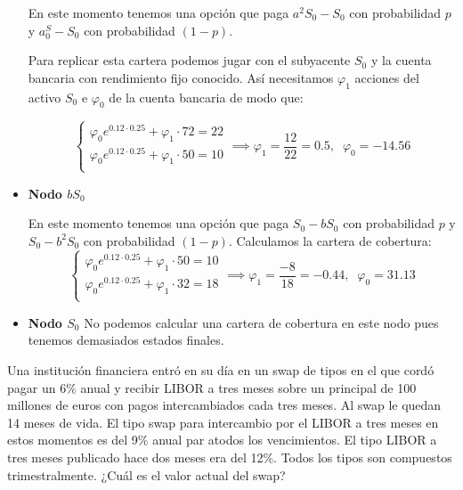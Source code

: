 \begin{problem}[2]
\begin{itemize}
En este momento tenemos una opción que paga $a^2S_0-S_0$ con probabilidad $p$ y $a^S_0-S_0$ con probabilidad $(1-p)$.

Para replicar esta cartera podemos jugar con el subyacente $S_0$ y la cuenta bancaria con rendimiento fijo conocido. Así necesitamos $\varphi_1$ acciones del activo $S_0$ e $\varphi_0$ de la cuenta bancaria de modo que:

\[\left\{\begin{array}{l}
\varphi_0 e^{0.12\cdot 0.25}+\varphi_1 \cdot 72 = 22 \\
\varphi_0 e^{0.12\cdot 0.25}+\varphi_1 \cdot 50 = 10 \\
\end{array}\right. \implies \varphi_1 = \frac{12}{22} = 0.5, \;\; \varphi_0 = -14.56\]

\item \textbf{Nodo $bS_0$}

En este momento tenemos una opción que paga $S_0-bS_0$ con probabilidad $p$ y $S_0-b^2S_0$ con probabilidad $(1-p)$. Calculamos la cartera de cobertura:
\[\left\{\begin{array}{l}
\varphi_0 e^{0.12\cdot 0.25}+\varphi_1 \cdot 50 = 10 \\
\varphi_0 e^{0.12\cdot 0.25}+\varphi_1 \cdot 32 = 18 \\
\end{array}\right. \implies \varphi_1 = \frac{-8}{18} = -0.44, \;\; \varphi_0 = 31.13\]

\item \textbf{Nodo $S_0$}
No podemos calcular una cartera de cobertura en este nodo pues tenemos demasiados estados finales.
\end{itemize}

\end{problem}

\begin{problem}[3]
Una institución financiera entró en su día en un swap de tipos en el que cordó pagar un 6\% anual y recibir LIBOR a tres meses sobre un principal de 100 millones de euros con pagos intercambiados cada tres meses. Al swap le quedan 14 meses de vida. El tipo swap para intercambio por el LIBOR a tres meses en estos momentos es del 9\% anual par atodos los vencimientos. El tipo LIBOR a tres meses publicado hace dos meses era del 12\%. Todos los tipos son compuestos trimestralmente. ¿Cuál es el valor actual del swap?
\solution

\end{problem}


